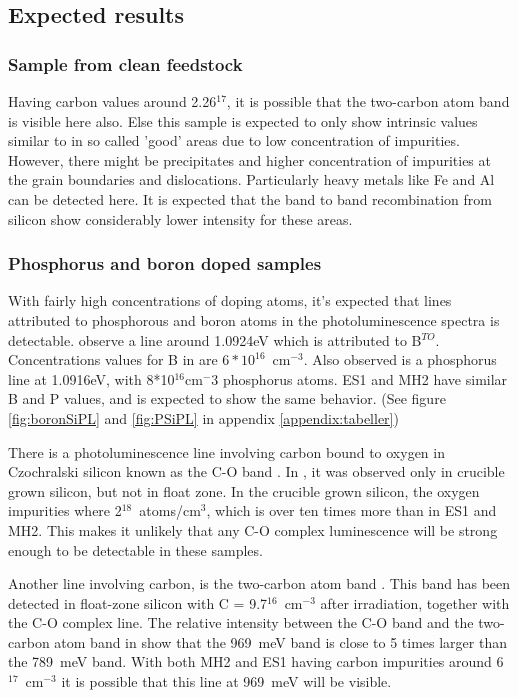 \subsection{Expected results}


\subsubsection{Sample from clean feedstock}

Having carbon values around 2.26$^{17}$, it is possible that the two-carbon atom band is visible here also. Else this sample is expected to only show intrinsic values similar to \cite{dean67} in so called 'good' areas due to low concentration of impurities. However, there might be precipitates and higher concentration of impurities at the grain boundaries and dislocations. Particularly heavy metals like Fe and Al can be detected here. It is expected that the band to band recombination from silicon show considerably lower intensity for these areas.




\subsubsection{Phosphorus and boron doped samples}

With fairly high concentrations of doping atoms, it's expected that lines attributed to phosphorous and boron atoms in the photoluminescence spectra is detectable. \cite{dean67} observe a line around 1.0924eV which is attributed to B$^{TO}$. Concentrations values for B in \cite{dean67} are $6*10^{16}$~cm$^{-3}$. Also observed is a phosphorus line at 1.0916eV, with 8*10$^{16}$cm$^-3$ phosphorus atoms. ES1 and MH2 have similar B and P values, and is expected to show the same behavior. (See figure \ref{fig:boronSiPL} and \ref{fig:PSiPL} in appendix \ref{appendix:tabeller})

There is a photoluminescence line involving carbon bound to oxygen in Czochralski silicon known as the C-O band \cite{davies88}. In \cite{hare72}, it was observed only in crucible grown silicon, but not in float zone. In the crucible grown silicon, the oxygen impurities where 2$^{18}$~atoms/cm$^3$, which is over ten times more than in ES1 and MH2. This makes it unlikely that any C-O complex luminescence will be strong enough to be detectable in these samples.

Another line involving carbon, is the two-carbon atom band \cite{davies88}. This band has been detected in float-zone silicon with C = 9.7$^{16}$~cm$^{-3}$ after irradiation, together with the C-O complex line. The relative intensity between the C-O band and the two-carbon atom band in \cite{davies88} show that the 969~meV band is close to 5 times larger than the 789~meV band. With both MH2 and ES1 having carbon impurities around 6$^{17}$~cm$^{-3}$ it is possible that this line at 969~meV will be visible. 

